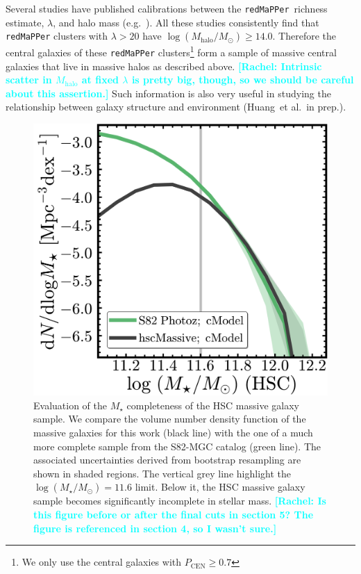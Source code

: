 \documentclass[a4paper,fleqn,usenatbib]{mnras}
\def\etal{{\ et al.~}}
\def\redm{\texttt{redMaPPer}}
\def\mstar{{$M_{\star}$}}
\def\mhalo{{$M_{\mathrm{halo}}$}}
\def\logms{{$\log (M_{\star}/M_{\odot})$}}
\newcommand{\rachel}[1]{\textcolor{cyan}{\textbf{[Rachel: #1]}}}
\begin{document}
    Several studies have published calibrations between the \redm{}~richness estimate, 
    $\lambda$, and halo mass (e.g.\ \citealt{Saro2015, Farahi2016, Simet2016, 
    Melchior2016}). 
    All these studies consistently find that \redm{} clusters with $\lambda > 20$ 
    have $\log (M_{\mathrm{halo}}/M_{\odot}) \geq 14.0$. 
    Therefore the central galaxies of these \redm{} clusters\footnote{We only use the 
    central galaxies with $P_{\mathrm{CEN}} \geq 0.7$} form a sample of massive central 
    galaxies that live in massive halos as described above.
\rachel{Intrinsic scatter in \mhalo{} at fixed $\lambda$ is pretty big, though, so we should be careful about this assertion.}
Such information is also very useful in studying the relationship between galaxy
    structure and environment (Huang\etal in prep.).

  \begin{figure}
      \centering 
      \includegraphics[width=\columnwidth]{fig/redbcg_completeness}
      \caption{
          Evaluation of the \mstar{} completeness of the HSC massive galaxy sample.
          We compare the volume number density function of the massive galaxies 
          for this work (black line) with the one of a much more complete sample
          from the S82-MGC catalog (green line).  
          The associated uncertainties derived from bootstrap resampling are shown in 
          shaded regions. 
          The vertical grey line highlight the \logms{}$=11.6$ limit.  
          Below it, the HSC massive galaxy sample becomes significantly incomplete in 
          stellar mass. 
\rachel{Is this figure before or after the final cuts in section 5?  The figure is referenced in section 4, so I wasn't sure.}
}
      \label{fig:mass_complete}
  \end{figure}     
 
\end{document}
